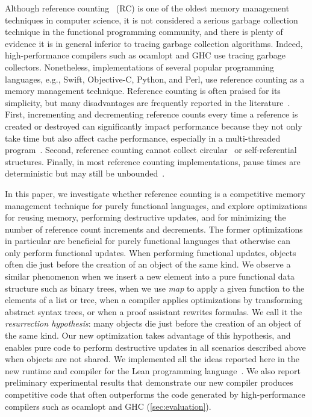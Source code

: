 Although reference counting~\cite{classicRC} (RC) is one of the oldest
memory management techniques in computer science, it is not considered
a serious garbage collection technique in the functional programming
community, and there is plenty of evidence it is in general inferior
to tracing garbage collection algorithms. Indeed, high-performance
compilers such as ocamlopt and GHC use tracing garbage
collectors. Nonetheless, implementations of several popular
programming languages, e.g., Swift, Objective-C, Python, and Perl, use
reference counting as a memory management technique. Reference
counting is often praised for its simplicity, but many disadvantages
are frequently reported in the
literature~\cite{GCbook,GCsurvey}. First, incrementing and
decrementing reference counts every time a reference is created or
destroyed can significantly impact performance because they not only
take time but also affect cache performance, especially in a
multi-threaded program~\cite{biasedRC}. Second, reference counting
cannot collect circular~\cite{cyclesRC} or self-referential
structures. Finally, in most reference counting implementations, pause
times are deterministic but may still be unbounded~\cite{BoehmCostRC}.

In this paper, we investigate whether reference counting is a
competitive memory management technique for purely functional
languages, and explore optimizations for reusing memory, performing
destructive updates, and for minimizing the number of reference count
increments and decrements. The former optimizations in particular are
beneficial for purely functional languages that otherwise can only
perform functional updates. When performing functional updates,
objects often die just before the creation of an object of the same
kind.  We observe a similar phenomenon when we insert a new element
into a pure functional data structure such as binary trees, when we
use \emph{map} to apply a given function to the elements of a list or
tree, when a compiler applies optimizations by transforming abstract
syntax trees, or when a proof assistant rewrites formulas. We call it the
\emph{resurrection hypothesis}: many objects die just before the
creation of an object of the same kind. Our new optimization takes
advantage of this hypothesis, and enables pure code to perform
destructive updates in all scenarios described above when objects are
not shared.  We implemented all the ideas reported here in the new
runtime and compiler for the Lean programming language~\cite{Lean}. We
also report preliminary experimental results that demonstrate our new
compiler produces competitive code that often outperforms the code
generated by high-performance compilers such as ocamlopt and GHC
(\cref{sec:evaluation}).

